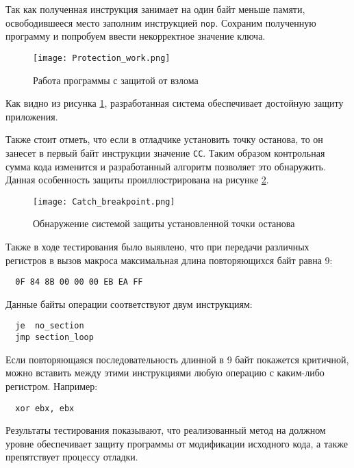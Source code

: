 Так как полученная инструкция занимает на один байт меньше памяти,
освободившееся место заполним инструкцией \verb!nop!. Сохраним полученную
программу и попробуем ввести некорректное значение ключа.

\begin{figure}[htpb]
  \centering
  \texttt{[image: Protection\_work.png]}
  \caption{Работа программы с защитой от взлома}
  \label{fig:protection_work}
\end{figure}

Как видно из рисунка \ref{fig:protection_work}, разработанная система
обеспечивает достойную защиту приложения.

Также стоит отметь, что если в отладчике установить точку останова, то он
занесет в первый байт инструкции значение \verb!CC!. Таким образом контрольная
сумма кода изменится и разработанный алгоритм позволяет это обнаружить. Данная
особенность защиты проиллюстрирована на рисунке \ref{fig:break_poin_catch}.

\begin{figure}[htpb]
  \centering
  \texttt{[image: Catch\_breakpoint.png]}
  \caption{Обнаружение системой защиты установленной точки останова}
  \label{fig:break_poin_catch}
\end{figure}

Также в ходе тестирования было выявлено, что при передачи различных регистров в
вызов макроса максимальная длина повторяющихся байт равна 9:
\begin{verbatim}
  0F 84 8B 00 00 00 EB EA FF
\end{verbatim}

Данные байты операции соответствуют двум инструкциям:
\begin{verbatim}
  je  no_section
  jmp section_loop
\end{verbatim}

Если повторяющаяся последовательность длинной в 9 байт покажется критичной,
можно вставить между этими инструкциями любую операцию с каким-либо регистром.
Например:
\begin{verbatim}
  xor ebx, ebx
\end{verbatim}

Результаты тестирования показывают, что реализованный метод на должном уровне
обеспечивает защиту программы от модификации исходного кода, а также
препятствует процессу отладки. 
